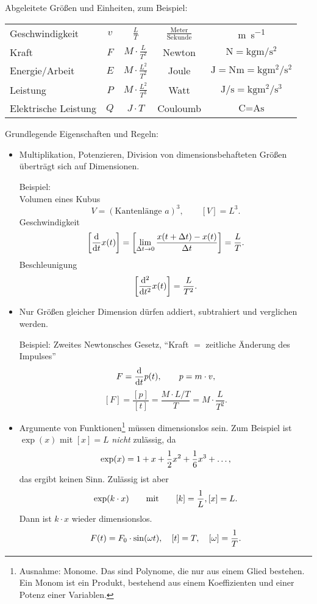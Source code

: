 Abgeleitete Größen und Einheiten, zum Beispiel:
\begin{center}
  \begin{tabular}{l|c|c|c|c}
    Geschwindigkeit & $v$ & $\frac{L}{T}$
    & $\frac{\text{Meter}}{\text{Sekunde}}$ & \si{\m \per \s} \\
    Kraft & $F$ & $M \cdot \frac{L}{T^2}$
    & Newton & $\si{\newton} = \si{\kg \m \per \s \squared}$ \\
    Energie/Arbeit & $E$ & $M \cdot \frac{L^2}{T^2}$
    & Joule & $\si{\joule} = \si{\newton \m} = \si{\kg \m \squared \per \second \squared}$ \\
    Leistung & $P$ & $M \cdot \frac{L^2}{T^3}$
    & Watt & $\si{\joule \per \s} = \si{\kg \m \squared \per \second \cubed}$ \\
    Elektrische Leistung & $Q$ & $J \cdot T$
    & Couloumb & $\si{\coulomb} = \si{\ampere \s}$
  \end{tabular}
\end{center}

Grundlegende Eigenschaften und Regeln:
\begin{itemize}
\item Multiplikation, Potenzieren, Division von dimensionsbehafteten Größen
  überträgt sich auf Dimensionen.

  Beispiel: \\
  Volumen eines Kubus
  \[ V = (\text{Kantenlänge } a)^3, \qquad [V] = L^3. \]
  Geschwindigkeit
  \[ \left[ \frac{\mathrm{d} }{\mathrm{d} t} x(t) \right] = \left[ \lim_{\Delta t \to 0} \frac{x(t +
        \Delta t) - x(t)}{\Delta t} \right] = \frac{L}{T}. \]
  Beschleunigung
  \[ \left[ \frac{\mathrm{d}^2}{\mathrm{d} t^2} x(t) \right] = \frac{L}{T^2}. \]
\item Nur Größen gleicher Dimension dürfen addiert, subtrahiert und verglichen
  werden.

  Beispiel: Zweites Newtonsches Gesetz, ``Kraft $=$ zeitliche Änderung des
  Impulses''
  \[ F = \frac{\mathrm{d} }{\mathrm{d} t} p(t), \qquad p = m \cdot v, \]
  \[ [ F ] = \frac{[p]}{[t]} = \frac{M \cdot L/T}{T} = M \cdot \frac{L}{T^2}. \]
\item Argumente von Funktionen\footnote{%
    Ausnahme: Monome. Das sind Polynome, die nur aus einem Glied bestehen. Ein
    Monom ist ein Produkt, bestehend aus einem Koeffizienten und einer Potenz
    einer Variablen.}%
  müssen dimensionslos sein. Zum Beispiel ist $\exp(x)$ mit $[x] = L$
  \emph{nicht} zulässig, da
  \[ \exp(x) = 1 + x + \frac{1}{2} x^2 + \frac{1}{6} x^3 + \ldots, \]
  das ergibt keinen Sinn. Zulässig ist aber
  \[ \exp( k \cdot x ) \qquad \text{mit} \qquad [k] = \frac{1}{L}, [x] = L. \]
  Dann ist $k \cdot x$ wieder dimensionslos.
  \[ F(t) = F_0 \cdot \sin (\omega t), \quad [t] = T, \quad [\omega] =
    \frac{1}{T}. \]
\end{itemize}

